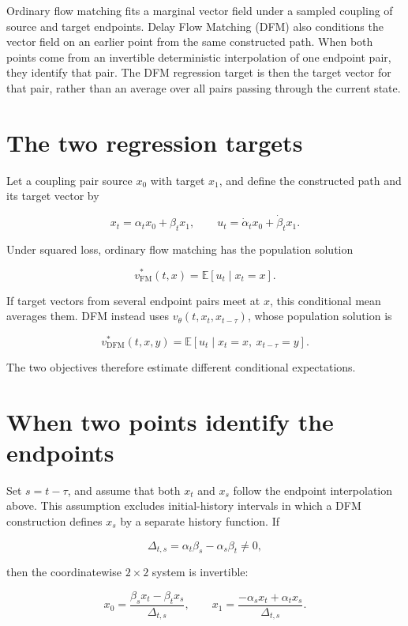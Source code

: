 \documentclass[11pt]{article}
\begin{document}
Ordinary flow matching fits a marginal vector field under a sampled coupling of source and target endpoints. Delay Flow Matching (DFM) also conditions the vector field on an earlier point from the same constructed path. When both points come from an invertible deterministic interpolation of one endpoint pair, they identify that pair. The DFM regression target is then the target vector for that pair, rather than an average over all pairs passing through the current state.

\section{The two regression targets}\label{the-two-objectives}

Let a coupling pair source \(x_0\) with target \(x_1\), and define the constructed path and its target vector by

\[
x_t=\alpha_tx_0+\beta_tx_1,
\qquad
u_t=\dot\alpha_tx_0+\dot\beta_tx_1.
\]

Under squared loss, ordinary flow matching has the population solution

\[
v^*_{\mathrm{FM}}(t,x)=\mathbb E[u_t\mid x_t=x].
\]

If target vectors from several endpoint pairs meet at \(x\), this conditional mean averages them. DFM instead uses \(v_\theta(t,x_t,x_{t-\tau})\), whose population solution is

\[
v^*_{\mathrm{DFM}}(t,x,y)
=\mathbb E[u_t\mid x_t=x,\ x_{t-\tau}=y].
\]

The two objectives therefore estimate different conditional expectations.

\section{When two points identify the endpoints}\label{two-points-recover-the-endpoints}

Set \(s=t-\tau\), and assume that both \(x_t\) and \(x_s\) follow the endpoint interpolation above. This assumption excludes initial-history intervals in which a DFM construction defines \(x_s\) by a separate history function. If

\[
\Delta_{t,s}=\alpha_t\beta_s-\alpha_s\beta_t\neq0,
\]

then the coordinatewise \(2\times2\) system is invertible:

\[
x_0=\frac{\beta_sx_t-\beta_tx_s}{\Delta_{t,s}},
\qquad
x_1=\frac{-\alpha_sx_t+\alpha_tx_s}{\Delta_{t,s}}.
\]
\end{document}
